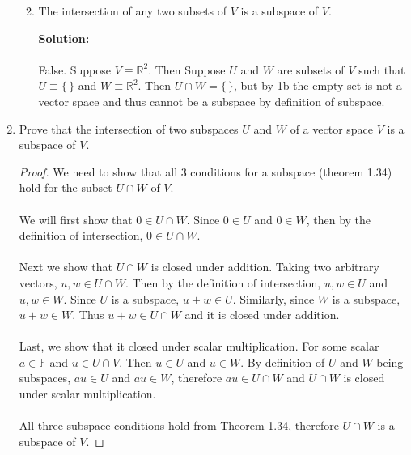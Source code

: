 \documentclass[12pt]{article}
\newcommand{\R}{\mathbb{R}}
\newcommand{\F}{\mathbb{F}}
\renewcommand{\emptyset}{\{\,\}}
\begin{document}
\begin{enumerate}
\begin{enumerate}
\begin{mybox}
        \end{mybox}
        \vspace{0.5in}
        \item The intersection of any two subsets of $V$ is a subspace of $V$.
        \begin{mybox}
            \textbf{Solution:}\\\\False. Suppose $V \equiv \R^2$. Then Suppose $U$ and $W$ are subsets of $V$ such that $U \equiv \emptyset$ and $W \equiv \R^2$. Then $U \cap W = \emptyset$, but by 1b the empty set is not a vector space and thus cannot be a subspace by definition of subspace.
        \end{mybox}
    \end{enumerate}
\vspace{3in}
\item  Prove that the intersection of two subspaces $U$ and $W$ of a vector space $V$ is a subspace of $V$.
        \begin{mybox}
            \begin{proof}
                We need to show that all 3 conditions for a subspace (theorem 1.34) hold for the subset $U \cap W$ of $V$.
                    \\\\We will first show that $0 \in U \cap W$. Since $0 \in U$ and $0 \in W$, then by the definition of intersection, $0 \in U \cap W$.
                    \\\\Next we show that $U \cap W$ is closed under addition. Taking two arbitrary vectors, $u, w \in U \cap W$. Then by the definition of intersection, $u, w \in U$ and $u, w \in W$. Since $U$ is a subspace, $u + w \in U$. Similarly, since $W$ is a subspace, $u + w \in W$. Thus $u + w \in U \cap W$ and it is closed under addition. 
                    \\\\Last, we show that it closed under scalar multiplication. For some scalar $a \in \F$ and $u \in U \cap V$. Then $u \in U$ and $u \in W$. By definition of $U$ and $W$ being subspaces, $au \in U$ and $au \in W$, therefore $au \in U \cap W$ and $U \cap W$ is closed under scalar multiplication.
                    \\\\All three subspace conditions hold from Theorem 1.34, therefore $U \cap W$ is a subspace of $V$.
            \end{proof}
        \end{mybox}

\end{enumerate}
\end{document}

